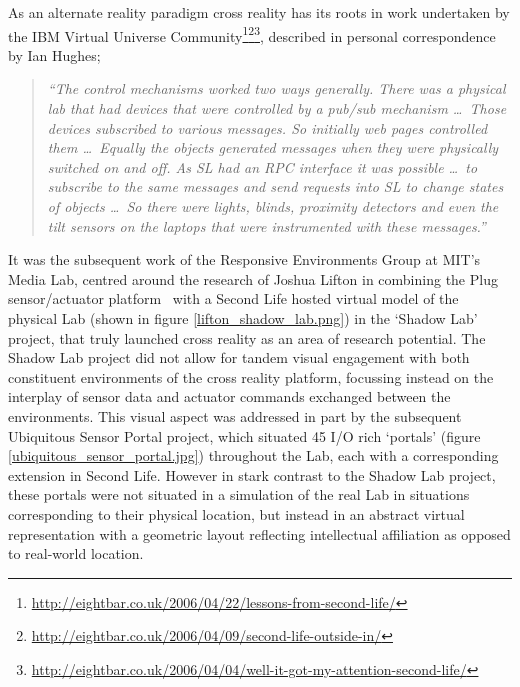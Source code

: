 
As an alternate reality paradigm cross reality has its roots in work undertaken by the IBM Virtual Universe Community\footnote{\url{http://eightbar.co.uk/2006/04/22/lessons-from-second-life/}}\footnote{\url{http://eightbar.co.uk/2006/04/09/second-life-outside-in/}}\footnote{\url{http://eightbar.co.uk/2006/04/04/well-it-got-my-attention-second-life/}}, described in personal correspondence by Ian Hughes;

\begin{quote}
\textit{``The control mechanisms worked two ways generally. There was a physical lab that had devices that were controlled by a pub/sub mechanism \ldots\ Those devices subscribed to various messages. So initially web pages controlled them \ldots\ Equally the objects generated messages when they were physically switched on and off. As SL\SLfootnote{} had an RPC interface it was possible \ldots\ to subscribe to the same messages and send requests into SL to change states of objects \ldots\ So there were lights, blinds, proximity detectors and even the tilt sensors on the laptops that were instrumented with these messages.''}
\end{quote}

It was the subsequent work of the Responsive Environments Group at MIT's Media Lab, centred around the research of Joshua Lifton in combining the Plug sensor/actuator platform~\cite{Lifton2007b} with a Second Life hosted virtual model of the physical Lab (shown in figure \ref{lifton_shadow_lab.png}) in the `Shadow Lab' project, that truly launched cross reality as an area of research potential. The Shadow Lab project did not allow for tandem visual engagement with both constituent environments of the cross reality platform, focussing instead on the interplay of sensor data and actuator commands exchanged between the environments. This visual aspect was addressed in part by the subsequent Ubiquitous Sensor Portal project, which situated 45 I/O rich `portals' (figure \ref{ubiquitous_sensor_portal.jpg}) throughout the Lab, each with a corresponding extension in Second Life. However in stark contrast to the Shadow Lab project, these portals were not situated in a simulation of the real Lab in situations corresponding to their physical location, but instead in an abstract virtual representation with a geometric layout reflecting intellectual affiliation as opposed to real-world location.

